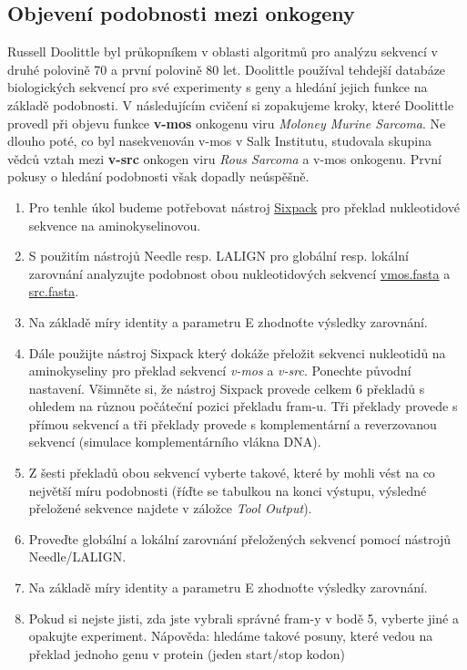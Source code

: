 \documentclass[11pt]{article}
\begin{document}
\subsection{Objevení podobnosti mezi onkogeny}
\label{sec:org6a846df}
Russell Doolittle byl průkopníkem v oblasti algoritmů pro analýzu sekvencí v
druhé polovině 70 a první polovině 80 let. Doolittle používal tehdejší databáze
biologických sekvencí pro své experimenty s geny a hledání jejich funkce na
základě podobnosti. V následujícím cvičení si zopakujeme kroky, které Doolittle
provedl při objevu funkce \textbf{v-mos} onkogenu viru \emph{Moloney Murine Sarcoma}. Ne dlouho
poté, co byl nasekvenován v-mos v Salk Institutu, studovala skupina vědců vztah
mezi \textbf{v-src} onkogen viru \emph{Rous Sarcoma} a v-mos onkogenu. První pokusy o hledání
podobnosti však dopadly neúspěšně.

\begin{enumerate}
\item Pro tenhle úkol budeme potřebovat nástroj \href{https://www.ebi.ac.uk/Tools/st/emboss\_sixpack/}{Sixpack} pro překlad nukleotidové
sekvence na aminokyselinovou.
\item S použitím nástrojů Needle resp. LALIGN pro globální resp. lokální zarovnání
analyzujte podobnost obou nukleotidových sekvencí \href{data/vmos.fasta}{vmos.fasta} a \href{data/src.fasta}{src.fasta}.
\item Na základě míry identity a parametru E zhodnoťte výsledky zarovnání.
\item Dále použijte nástroj Sixpack který dokáže přeložit sekvenci nukleotidů na
aminokyseliny pro překlad sekvencí \emph{v-mos} a \emph{v-src}.  Ponechte původní
nastavení. Všimněte si, že nástroj Sixpack provede celkem 6 překladů s
ohledem na různou počáteční pozici překladu fram-u. Tři překlady provede s
přímou sekvencí a tři překlady provede s komplementární a reverzovanou
sekvencí (simulace komplementárního vlákna DNA).
\item Z šesti překladů obou sekvencí vyberte takové, které by mohli vést na co
největší míru podobnosti (říďte se tabulkou na konci výstupu, výsledné
přeložené sekvence najdete v záložce \emph{Tool Output}).
\item Proveďte globální a lokální zarovnání přeložených sekvencí pomocí nástrojů
Needle/LALIGN.
\item Na základě míry identity a parametru E zhodnoťte výsledky zarovnání.
\item Pokud si nejste jisti, zda jste vybrali správné fram-y v bodě 5, vyberte jiné
a opakujte experiment. Nápověda: hledáme takové posuny, které vedou na
překlad jednoho genu v protein (jeden start/stop kodon)
\end{enumerate}
\end{document}
